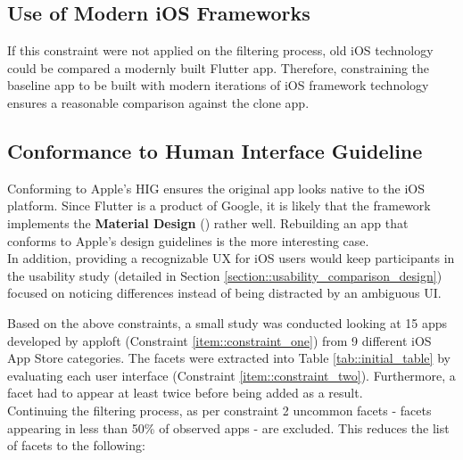 \subsection*{Use of Modern iOS Frameworks}
If this constraint were not applied on the filtering process, old iOS technology could be compared a modernly built Flutter app.
Therefore, constraining the baseline app to be built with modern iterations of iOS framework technology ensures a reasonable comparison 
against the clone app.

\subsection*{Conformance to Human Interface Guideline}
Conforming to Apple's HIG ensures the original app looks native to the iOS platform.
Since Flutter is a product of Google, it is likely that the framework implements the \textbf{Material Design} (\cite{Google2021}) rather well. Rebuilding an app that conforms to Apple's design guidelines is the more interesting case.\\
In addition, providing a recognizable UX for iOS users would keep participants in the usability study (detailed in Section \ref{section::usability_comparison_design}) focused on noticing differences instead of 
being distracted by an ambiguous UI.
\hfill \break

Based on the above constraints, a small study was conducted looking at 15 apps developed by apploft (Constraint \ref{item::constraint_one}) from 9 different iOS App Store categories. 
The facets were extracted into Table \ref{tab::initial_table} by evaluating each user interface (Constraint \ref{item::constraint_two}).
Furthermore, a facet had to appear at least twice before being added as a result.\\
Continuing the filtering process, as per constraint 2 uncommon facets - facets appearing
in less than 50\% of observed apps - are excluded. This reduces the list of facets to the following:

